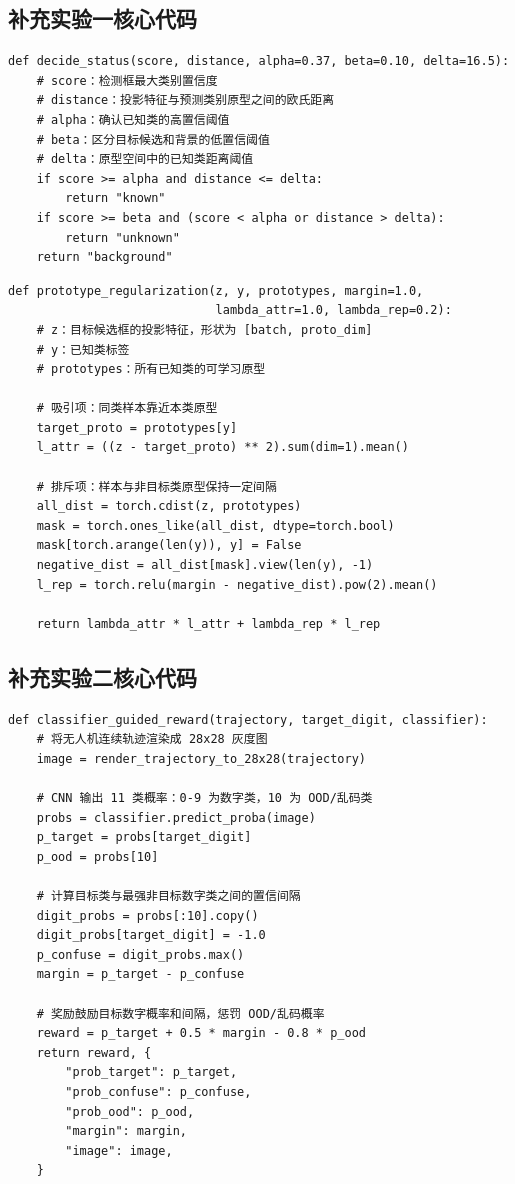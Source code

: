 \documentclass[UTF8,a4paper,12pt]{ctexart}
\begin{document}
\subsection{补充实验一核心代码}

\begin{lstlisting}[caption={Supplement 1 open-set decision rule},label={lst:supp-osod-decision}]
def decide_status(score, distance, alpha=0.37, beta=0.10, delta=16.5):
    # score：检测框最大类别置信度
    # distance：投影特征与预测类别原型之间的欧氏距离
    # alpha：确认已知类的高置信阈值
    # beta：区分目标候选和背景的低置信阈值
    # delta：原型空间中的已知类距离阈值
    if score >= alpha and distance <= delta:
        return "known"
    if score >= beta and (score < alpha or distance > delta):
        return "unknown"
    return "background"
\end{lstlisting}

\begin{lstlisting}[caption={Supplement 1 prototype regularization},label={lst:supp-osod-proto}]
def prototype_regularization(z, y, prototypes, margin=1.0,
                             lambda_attr=1.0, lambda_rep=0.2):
    # z：目标候选框的投影特征，形状为 [batch, proto_dim]
    # y：已知类标签
    # prototypes：所有已知类的可学习原型

    # 吸引项：同类样本靠近本类原型
    target_proto = prototypes[y]
    l_attr = ((z - target_proto) ** 2).sum(dim=1).mean()

    # 排斥项：样本与非目标类原型保持一定间隔
    all_dist = torch.cdist(z, prototypes)
    mask = torch.ones_like(all_dist, dtype=torch.bool)
    mask[torch.arange(len(y)), y] = False
    negative_dist = all_dist[mask].view(len(y), -1)
    l_rep = torch.relu(margin - negative_dist).pow(2).mean()

    return lambda_attr * l_attr + lambda_rep * l_rep
\end{lstlisting}

\subsection{补充实验二核心代码}

\begin{lstlisting}[caption={Supplement 2 classifier-guided reward},label={lst:supp-drone-reward}]
def classifier_guided_reward(trajectory, target_digit, classifier):
    # 将无人机连续轨迹渲染成 28x28 灰度图
    image = render_trajectory_to_28x28(trajectory)

    # CNN 输出 11 类概率：0-9 为数字类，10 为 OOD/乱码类
    probs = classifier.predict_proba(image)
    p_target = probs[target_digit]
    p_ood = probs[10]

    # 计算目标类与最强非目标数字类之间的置信间隔
    digit_probs = probs[:10].copy()
    digit_probs[target_digit] = -1.0
    p_confuse = digit_probs.max()
    margin = p_target - p_confuse

    # 奖励鼓励目标数字概率和间隔，惩罚 OOD/乱码概率
    reward = p_target + 0.5 * margin - 0.8 * p_ood
    return reward, {
        "prob_target": p_target,
        "prob_confuse": p_confuse,
        "prob_ood": p_ood,
        "margin": margin,
        "image": image,
    }
\end{lstlisting}
\end{document}
